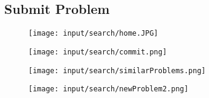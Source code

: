 \subsection{Submit Problem}

\begin{frame}
\begin{figure}[htbp]
\begin{center}
\texttt{[image: input/search/home.JPG]}
\end{center}
\end{figure}

\end{frame}

\begin{frame}

\begin{figure}[htbp]
\begin{center}
\texttt{[image: input/search/commit.png]}
\end{center}
\end{figure}

\end{frame}

\begin{frame}

\begin{figure}[htbp]
\begin{center}
\texttt{[image: input/search/similarProblems.png]}
\end{center}
\end{figure}

\end{frame}

\begin{frame}

\begin{figure}[htbp]
\begin{center}
\texttt{[image: input/search/newProblem2.png]}
\end{center}
\end{figure}

\end{frame}

\newcommand{\tagone}{Computer}
\newcommand{\tagtwo}{Blue screen}
